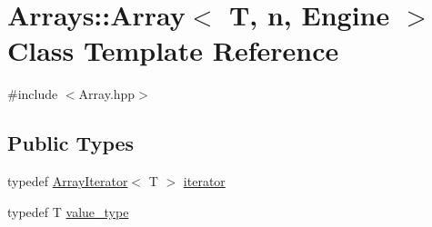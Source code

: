 \hypertarget{classArrays_1_1Array}{}\section{Arrays\+:\+:Array$<$ T, n, Engine $>$ Class Template Reference}
\label{classArrays_1_1Array}


{\ttfamily \#include $<$Array.\+hpp$>$}

\subsection*{Public Types}
\begin{DoxyCompactItemize}
\item 
typedef \hyperlink{classArrayIterator}{Array\+Iterator}$<$ T $>$ \hyperlink{classArrays_1_1Array_abbad078205d9e12b2aedc8599372edf1}{iterator}
\item 
typedef T \hyperlink{classArrays_1_1Array_a84024774dc2fa22359ee7c4fa510d586}{value\+\_\+type}
\end{DoxyCompactItemize}
